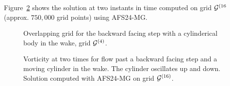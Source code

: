 \documentclass[11pt]{article}
\begin{document}
Figure~\ref{fig:backStepAndBodyMoveCylinder} shows the solution at two instants in time
computed on grid ${\mathcal G}^{(16}$ (approx. $750,000$ grid points) using AFS24-MG. 
{
\begin{figure}[hbt]
\newcommand{\figWidth}{15cm}
\newcommand{\trimfig}[2]{\trimFigb{#1}{#2}{0.0}{.25}{.27}{.275}}
\begin{center}\small
\caption{
Overlapping grid for the backward facing step with a cylinderical body in the wake, grid ${\mathcal G}^{(4)}$. 
}
\label{fig:backStepAndBodyGrids}
\end{center}
\end{figure}
}

{
\begin{figure}[hbt]
\newcommand{\figWidth}{11cm}
\newcommand{\trimfig}[2]{\trimFigb{#1}{#2}{0.0}{.0}{.27}{.3}}
\begin{center}\small
\caption{
Vorticity at two times for flow past a backward facing step and a moving cylinder in the wake. 
The cylinder oscillates up and down. 
Solution computed with AFS24-MG on grid ${\mathcal G}^{(16)}$.
}
\label{fig:backStepAndBodyMoveCylinder}
\end{center}
\end{figure}
}
\end{document}
